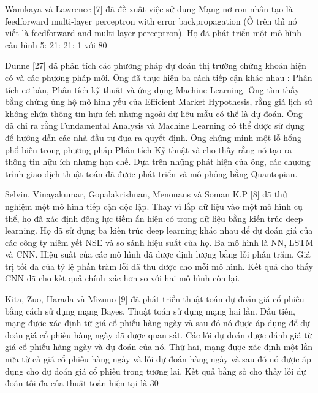 Wamkaya và Lawrence [7] đã đề xuất việc sử dụng Mạng nơ ron nhân tạo là feedforward multi-layer perceptron with error backpropagation (Ở trên thì nó viết là feedforward and multi-layer perceptron). Họ đã phát triển một mô hình cấu hình 5: 21: 21: 1 với 80%

Dunne [27] đã phân tích các phương pháp dự đoán thị trường chứng khoán hiện có và các phương pháp mới. Ông đã thực hiện ba cách tiếp cận khác nhau : Phân tích cơ bản, Phân tích kỹ thuật và ứng dụng Machine Learning. Ông tìm thấy bằng chứng ủng hộ mô hình yếu của Efficient Market Hypothesis, rằng giá lịch sử không chứa thông tin hữu ích nhưng ngoài dữ liệu mẫu có thể là dự đoán. Ông đã chỉ ra rằng Fundamental Analysis và Machine Learning có thể được sử dụng để hướng dẫn các nhà đầu tư đưa ra quyết định. Ông chứng minh một lỗ hổng phổ biến trong phương pháp Phân tích Kỹ thuật và cho thấy rằng nó tạo ra thông tin hữu ích nhưng hạn chế. Dựa trên những phát hiện của ông, các chương trình giao dịch thuật toán đã được phát triển và mô phỏng bằng Quantopian.

Selvin, Vinayakumar, Gopalakrishnan, Menonans và Soman K.P [8] đã thử nghiệm một mô hình tiếp cận độc lập. Thay vì lắp dữ liệu vào một mô hình cụ thể, họ đã xác định động lực tiềm ẩn hiện có trong dữ liệu bằng kiến trúc deep learning. Họ đã sử dụng ba kiến trúc deep learning khác nhau để dự đoán giá của các công ty niêm yết NSE và so sánh hiệu suất của họ. Ba mô hình là NN, LSTM và CNN. Hiệu suất của các mô hình đã được định lượng bằng lỗi phần trăm. Giá trị tối đa của tỷ lệ phần trăm lỗi đã thu được cho mỗi mô hình. Kết quả cho thấy CNN đã cho kết quả chính xác hơn so với hai mô hình còn lại.

Kita, Zuo, Harada và Mizuno [9] đã phát triển thuật toán dự đoán giá cổ phiếu bằng cách sử dụng mạng Bayes. Thuật toán sử dụng mạng hai lần. Đầu tiên, mạng được xác định từ giá cổ phiếu hàng ngày và sau đó nó được áp dụng để dự đoán giá cổ phiếu hàng ngày đã được quan sát. Các lỗi dự đoán được đánh giá từ giá cổ phiếu hàng ngày và dự đoán của nó. Thứ hai, mạng được xác định một lần nữa từ cả giá cổ phiếu hàng ngày và lỗi dự đoán hàng ngày và sau đó nó được áp dụng cho dự đoán giá cổ phiếu trong tương lai. Kết quả bằng số cho thấy lỗi dự đoán tối đa của thuật toán hiện tại là 30%
